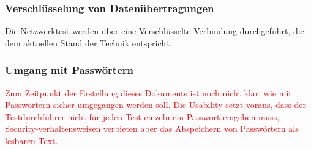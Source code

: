 \documentclass[
	ngerman,
	toc=listof, %
	toc=bibliography, %
	footnotes=multiple, %
	parskip=half, %
	numbers=noendperiod %
]{scrartcl}
\begin{document}
		\subsubsection{Verschlüsselung von Datenübertragungen}
		Die Netzwerktest werden über eine Verschlüsselte Verbindung durchgeführt, die dem aktuellen Stand der Technik entspricht.

		\subsubsection{Umgang mit Passwörtern}
		\textcolor{red}{Zum Zeitpunkt der Erstellung dieses Dokuments ist noch nicht klar, wie mit Passwörtern sicher umgegangen werden soll. Die Usability setzt voraus, dass der Testdurchführer nicht für jeden Test einzeln ein Passwort eingeben muss, Security-verhaltensweisen verbieten aber das Abspeichern von Passwörtern als lesbaren Text.}
\end{document}
